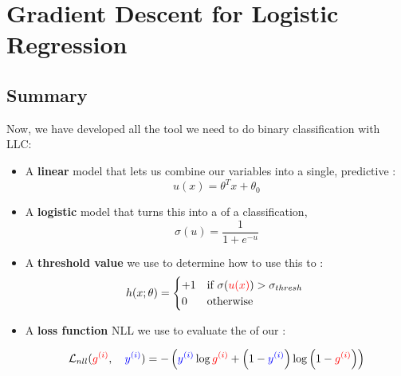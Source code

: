 \pagebreak

\section{Gradient Descent for Logistic Regression}

    \subsection{Summary}
    
    Now, we have developed all the tool we need to do binary classification with LLC:
    
    \begin{itemize}
        \item A \textbf{linear} model that lets us combine our  variables into a single, predictive :
            \begin{equation}
                u(x) = \theta^T x + \theta_0
            \end{equation}
            
        \item A \textbf{logistic} model that turns this  into a   of a classification,
            \begin{equation}
                \sigma(u) = \frac{1}{1+e^{-u}}
            \end{equation}
            
        \item A \textbf{threshold value} we use to determine how to use this  to :
            \begin{equation}
                h(x; \theta) = 
                \begin{cases}
                    +1 & \text{if $\sigma(\textcolor{red}{u(x)})>\sigma_{thresh}$ }\\
                    0 & \text{otherwise}
                \end{cases}
            \end{equation}
            
        \item A \textbf{loss function} NLL we use to evaluate the  of our :
        
            \begin{equation*}
                \mathcal{L}_{nll}
                (\textcolor{red}{g^{(i)}} ,\quad \textcolor{blue}{y^{(i)} })
                =
                -
                \left(
                    \textcolor{blue}{y^{(i)} } \log{ \textcolor{red}{g^{(i)}} }
                    +
                    \left( 1 - \textcolor{blue}{y^{(i)} } \right)
                    \log
                    \left( 1-\textcolor{red}{g^{(i)}} \right) 
                \right)
            \end{equation*}
            

\end{itemize}
